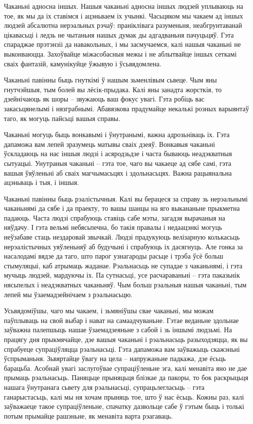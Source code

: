 Чаканьні адносна іншых. Нашыя чаканьні адносна іншых людзей уплываюць на тое, як мы да іх ставімся і ацэньваем іх учынкі. Часьцяком мы чакаем ад іншых людзей абсалютна нерэальных рэчаў: праніклівага разуменьня, неабгрунтаванай цікавасьці і ледзь не чытаньня нашых думак ды адгадваньня пачуцьцяў. Гэта спараджае прэтэнзіі да навакольных, і мы засмучаемся, калі нашыя чаканьні не выконваюцца. Захоўвайце міжасобасныя межы і не аблытвайце іншых сеткамі сваіх фантазій, камунікуйце ўжывую і ўсьвядомлена.

Чаканьні павінны быць гнуткімі ў нашым зьменлівым сьвеце. Чым яны гнутчэйшыя, тым болей вы лёсік-прыдака. Калі яны занадта жорсткія, то дзейнічаюць як шоры – звужаюць ваш фокус увагі. Гэта робіць вас закасьцянелымі і нязграбнымі. Абавязкова прадумайце некалькі розных варыянтаў таго, як могуць пайсьці вашыя справы.

Чаканьні могуць быць вонкавымі і ўнутранымі, важна адрозьніваць іх. Гэта дапаможа вам лепей зразумець матывы сваіх дзеяў. Вонкавыя чаканьні ўскладаюць на нас іншыя людзі і асяродзьдзе і часта бываюць неадэкватныя сытуацыі. Унутраныя чаканьні – гэта тое, чаго вы чакаеце ад сябе самі, гэта вашыя ўяўленьні аб сваіх магчымасьцях і здольнасьцях. Важна рацыянальна ацэньваць і тыя, і іншыя.

Чаканьні павінны быць рэалістычныя. Калі вы берацеся за справу зь нерэальнымі чаканьнямі да сябе і да праекту, то вашы шанцы на яго выкананьне прыкметна падаюць. Часта людзі спрабуюць ставіць сабе мэты, загадзя вырачаныя на няўдачу. І гэта вельмі небясьпечна, бо такія правалы і недаацэнкі могуць неўзабаве стаць нездаровай звычкай. Людзі прадукуюць велізарную колькасьць нерэалістычных уяўленьняў аб будучыні і спрабуюць іх дасягнуць. Але гонка за насалодамі вядзе да таго, што парог узнагароды расьце і трэба ўсё больш стымуляцыі, каб атрымаць жаданае. Рэальнасьць не супадае з чаканьнямі, і гэта мучыць людзей, мардуючы іх. Па сутнасьці, усе расчараваньні – гэта паказьнік нясьпелых і неадэкватных чаканьняў. Чым больш рэальныя нашыя чаканьні, тым лепей мы ўзаемадзейнічаем з рэальнасьцю.

Усьвядоміўшы, чаго мы чакаем, і зьмяніўшы свае чаканьні, мы можам паўплываць на свой выбар і нават на самаадчуваньне. Гэтае веданьне здольнае заўважна палепшыць нашае ўзаемадзеяньне з сабой і зь іншымі людзьмі. На працягу дня прыкмячайце, дзе вашыя чаканьні і рэальнасьць разыходзяцца, як вы спрабуеце супраціўляцца рэальнасьці. Гэта дапаможа вам заўважыць скажэньні ўспрыманьня. Зьвяртайце ўвагу на цела – напружаньне падкажа, дзе ёсьць барацьба. Асобнай увагі заслугоўвае супраціўленьне эга, калі менавіта яно не дае прымаць рэальнасьць. Паняцьце прыняцьця блізкае да пакоры, то бок раскрыцьця нашага ўнутранага сьвету для рэальнасьці, супрацьлегласьць – гэта ганарыстасьць, калі мы ня хочам прыняць тое, што ў нас ёсьць. Кожны раз, калі заўважаеце такое супраціўленьне, спачатку дазвольце сабе ў гэтым быць і толькі потым прымайце рашэньне, як менавіта варта рэагаваць.


